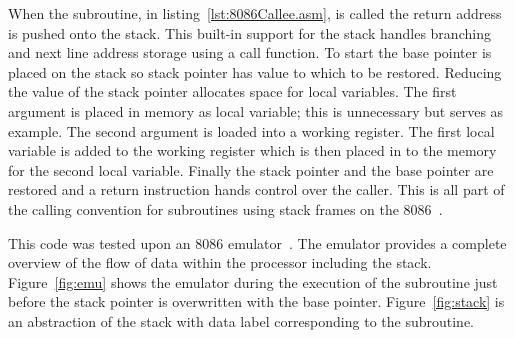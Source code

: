 \documentclass[12pt,a4paper]{article}
\begin{document}




When the subroutine, in listing~\ref{lst:8086Callee.asm}, is called the return address is pushed onto the stack.
This built-in support for the stack handles branching and next line address storage using a call function.
To start the base pointer is placed on the stack so stack pointer has value to which to be restored.
Reducing the value of the stack pointer allocates space for local variables.
The first argument is placed in memory as local variable; this is unnecessary but serves as example.
The second argument is loaded into a working register.
The first local variable is added to the working register which is then placed in to the memory for the second local variable.
Finally the stack pointer and the base pointer are restored and a return instruction hands control over the caller. 
This is all part of the calling convention for subroutines using stack frames on the 8086~\cite{8086call}.
 




This code was tested upon an 8086 emulator~\cite{emu8086}.
The emulator provides a complete overview of the flow of data within the processor including the stack. 
Figure~\ref{fig:emu} shows the emulator during the execution of the subroutine just before the stack pointer is overwritten with the base pointer.
Figure~\ref{fig:stack} is an abstraction of the stack with data label corresponding to the subroutine. 
\end{document}
